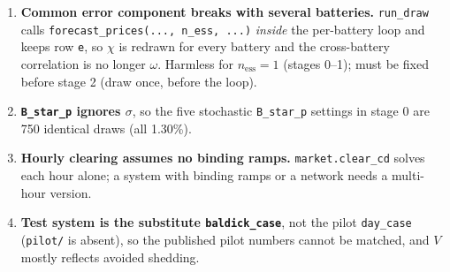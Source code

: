 \documentclass[10pt,a4paper]{article}
\newcommand{\code}[1]{\texttt{#1}}
\begin{document}
\begin{enumerate}
  \item \textbf{Common error component breaks with several batteries.} \code{run\_draw} calls
    \code{forecast\_prices(..., n\_ess, ...)} \emph{inside} the per-battery loop and keeps row \code{e}, so
    $\chi$ is redrawn for every battery and the cross-battery correlation is no longer $\omega$. Harmless for
    $n_{\text{ess}}=1$ (stages 0--1); must be fixed before stage 2 (draw once, before the loop).
  \item \textbf{\code{B\_star\_p} ignores $\sigma$}, so the five stochastic \code{B\_star\_p} settings in
    stage 0 are 750 identical draws (all 1.30\%).
  \item \textbf{Hourly clearing assumes no binding ramps.} \code{market.clear\_cd} solves each hour alone;
    a system with binding ramps or a network needs a multi-hour version.
  \item \textbf{Test system is the substitute \code{baldick\_case}}, not the pilot \code{day\_case}
    (\code{pilot/} is absent), so the published pilot numbers cannot be matched, and $V$ mostly reflects avoided
    shedding.
\end{enumerate}
\end{document}
